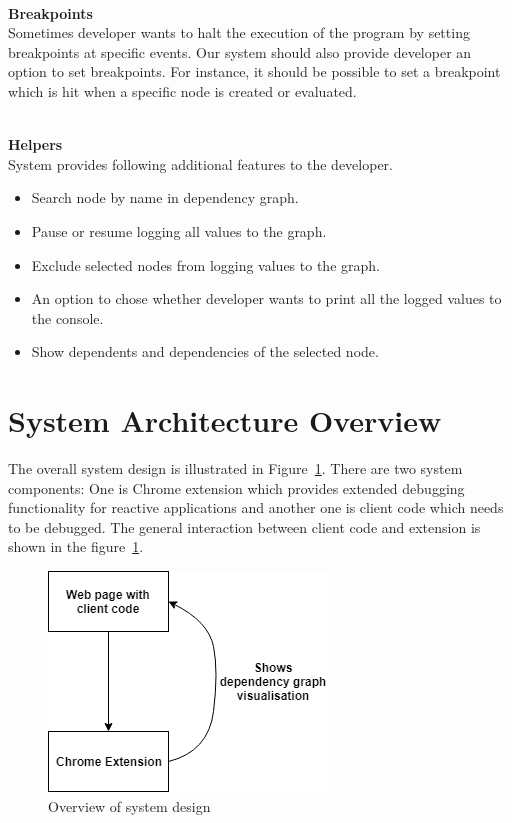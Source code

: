 \leavevmode
\\
\textbf{Breakpoints}
\\
Sometimes developer wants to halt the execution of the program by setting breakpoints at specific events. Our system should also provide developer an option to set breakpoints. For instance, it should be possible to set a breakpoint which is hit when a specific node is created or evaluated. 

\leavevmode
\\
\textbf{Helpers}
\\
System provides following additional features to the developer.

\begin{itemize}
	\item Search node by name in dependency graph.
	\item Pause or resume logging all values to the graph.
	\item Exclude selected nodes from logging values to the graph.
	\item An option to chose whether developer wants to print all the logged values to the console.
	\item Show dependents and dependencies of the selected node.
\end{itemize}

\section{System Architecture Overview}
The overall system design is illustrated in Figure~\ref{fig:system-design}. There are two system components: One is Chrome extension which provides extended debugging functionality for reactive applications and another one is client code which needs to be debugged. The general interaction between client code and extension is shown in the figure~\ref{fig:system-design}. 

\begin{figure}[!h]
	\centering
	\includegraphics[scale=0.5,trim=0 0 0 0]{images/system-design.png}
	\caption{Overview of system design}
	\label{fig:system-design}
\end{figure}

